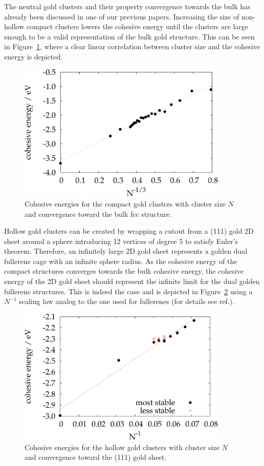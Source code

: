 The neutral gold clusters and their property convergence towards the bulk has
already been discussed in one of our previous papers.\autocite{Assadollahzadeh_systematicsearchminimum_2009}
Increasing the size of non-hollow compact clusters lowers the cohesive energy until the
clusters are large enough to be a valid representation of the bulk gold structure.
This can be seen in Figure~\ref{fig:cohesiveenergies1}, where a clear linear
correlation between cluster size and the cohesive energy is depicted.

\begin{figure}\centering
	\includegraphics[width=10cm]{golddual/cohesive.pdf}
	\caption{Cohesive energies for the compact gold clusters with cluster size $N$ and convergence toward the bulk fcc structure.}
	\label{fig:cohesiveenergies1}
\end{figure}

Hollow gold clusters can be created by wrapping a cutout from a (111) gold 2D sheet
around a sphere introducing 12 vertices of degree 5 to satisfy Euler's theorem. 
Therefore, an infinitely large 2D gold sheet represents a
golden dual fullerene cage with an infinite sphere radius. As the cohesive energy
of the compact structures converges towards the bulk cohesive energy,
the cohesive energy of the 2D gold sheet should represent the infinite limit for the dual
golden fullerene structures. This is indeed the case and is depicted in Figure~\ref{fig:cohesiveenergies2}
using a $N^{-1}$ scaling law analog to the one used for fullerenes (for details see ref.\autocite{Wirz_smallfullerenesgraphene_2015}). 

\begin{figure}\centering
	\includegraphics[width=10cm]{golddual/cohesive2.pdf}
	\caption{Cohesive energies for the hollow gold clusters with cluster size $N$ and convergence toward the (111) gold sheet.}
	\label{fig:cohesiveenergies2}
\end{figure}

